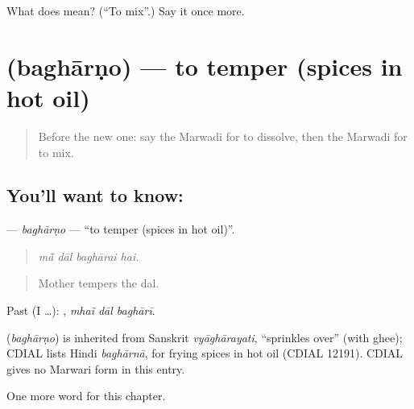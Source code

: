 \begin{tcolorbox}[breakable,colback=teal!4,colframe=teal!35!black,title={Before you move on}]
What does  mean? (\textquotedblleft{}To mix\textquotedblright{}.) Say it once more.
\end{tcolorbox}
\section[\texorpdfstring{\mw{बघारणो} (baghārṇo)}{बघारणो (baghārṇo)}]{ (baghārṇo) — to temper (spices in hot oil)}

\label{lesson:MW-C182-bagharno}



\begin{quote}
Before the new one: say the Marwadi for to dissolve, then the Marwadi for to mix.
\end{quote}

\subsection*{You'll want to know: }
\textbf{} — \emph{baghārṇo} — \textquotedblleft{}to temper (spices in hot oil)\textquotedblright{}.

\begin{quote}
   
\end{quote}

\begin{quote}
\emph{mā̃ dāl baghārai hai.}
\end{quote}

\begin{quote}
Mother tempers the dal.
\end{quote}

Past (I …):   , \emph{mhaĩ dāl baghārī}.

\begin{cousinweb}
\textbf{} (\emph{baghārṇo}) is inherited from Sanskrit \emph{vyāghārayati}, \textquotedblleft{}sprinkles over\textquotedblright{} (with ghee); CDIAL lists Hindi \emph{baghārnā}, for frying spices in hot oil (CDIAL 12191). CDIAL gives no Marwari form in this entry.
\end{cousinweb}

\begin{grammarlens}[title={What you've built}]
One more word for this chapter.
\end{grammarlens}

